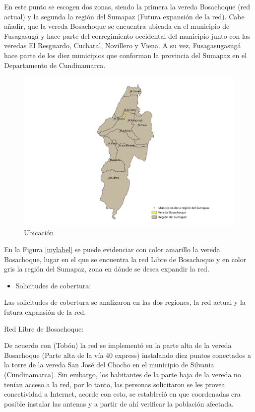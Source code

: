 \documentclass[]{article}
\providecommand{\tightlist}{%
  \setlength{\itemsep}{0pt}\setlength{\parskip}{0pt}}
\begin{document}
En este punto se escogen dos zonas, siendo la primera la vereda
Bosachoque (red actual) y la segunda la región del Sumapaz (Futura
expansión de la red). Cabe añadir, que la vereda Bosachoque se encuentra
ubicada en el municipio de Fusagasugá y hace parte del corregimiento
occidental del municipio junto con las veredas El Resguardo, Cucharal,
Novillero y Viena. A su vez, Fusagasugasugá hace parte de los diez
municipios que conforman la provincia del Sumapaz en el Departamento de
Cundinamarca.

\begin{figure}
\centering
\includegraphics{Bosachoque_sumapaz.pdf}
\caption{Ubicación}
\end{figure}

En la Figura \ref{mylabel} se puede evidenciar con color amarillo la
vereda Bosachoque, lugar en el que se encuentra la red Libre de
Bosachoque y en color gris la región del Sumapaz, zona en dónde se desea
expandir la red.

\begin{itemize}
\tightlist
\item
  Solicitudes de cobertura:
\end{itemize}

Las solicitudes de cobertura se analizaron en las dos regiones, la red
actual y la futura expansión de la red.

Red Libre de Bosachoque:

De acuerdo con (Tobón) la red se implementó en la parte alta de la
vereda Bosachoque (Parte alta de la vía 40 express) instalando diez
puntos conectados a la torre de la vereda San José del Chocho en el
municipio de Silvania (Cundinamarca). Sin embargo, los habitantes de la
parte baja de la vereda no tenían acceso a la red, por lo tanto, las
personas solicitaron se les provea conectividad a Internet, acorde con
esto, se estableció en que coordenadas era posible instalar las antenas
y a partir de ahí verificar la población afectada.
\end{document}
